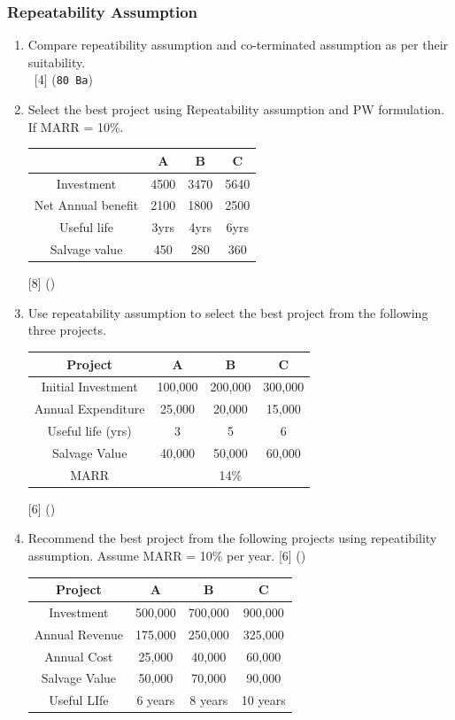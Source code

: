 \documentclass[12pt]{article}
\newcommand{\enter}{\\\textcolor{white}{1}}
\begin{document}
		\subsubsection{Repeatability Assumption}
			\begin{enumerate}
				\item Compare repeatibility assumption and co-terminated assumption as per their suitability.
				\enter\hfill [4] (\texttt{80 Ba})
				
				\item Select the best project using Repeatability assumption and PW formulation. If MARR = 10\%.\\
				\begin{tabular}{|c|c|c|c|}
					\hline
					& A & B & C \\ \hline
					Investment & 4500 & 3470 & 5640 \\ \hline
					Net Annual benefit & 2100 & 1800 & 2500 \\ \hline
					Useful life & 3yrs & 4yrs & 6yrs \\ \hline
					Salvage value & 450 & 280 & 360 \\ \hline
				\end{tabular}\hfill [8] ()
				
				\item Use repeatability assumption to select the best project from the following three projects. \\
				\begin{tabular}{|c|c|c|c|}
					\hline
					Project & A & B & C \\ \hline
					Initial Investment & 100,000 & 200,000 & 300,000 \\ \hline
					Annual Expenditure & 25,000 & 20,000 & 15,000 \\ \hline
					Useful life (yrs) & 3 & 5 & 6 \\ \hline
					Salvage Value & 40,000 & 50,000 & 60,000 \\ \hline
					MARR & \multicolumn{3}{c|}{14\%} \\ \hline
				\end{tabular}\hfill [6] ()
				
				\item Recommend the best project from the following projects using repeatibility assumption. Assume MARR = 10\% per year. \hfill [6] ()\\
				\begin{tabular}{|c|c|c|c|}
					\hline
					Project & A & B & C \\ \hline
					Investment & 500,000 & 700,000 & 900,000 \\ \hline
					Annual Revenue & 175,000 & 250,000 & 325,000 \\ \hline
					Annual Cost & 25,000 & 40,000 & 60,000 \\ \hline
					Salvage Value & 50,000 & 70,000 & 90,000 \\ \hline
					Useful LIfe & 6 years & 8 years & 10 years \\ \hline
				\end{tabular}
				

\end{enumerate}
\end{document}
